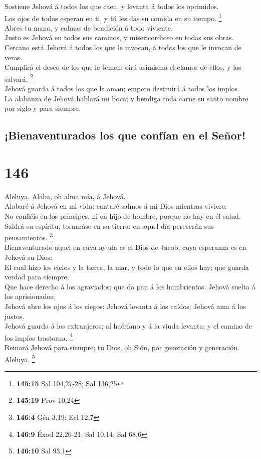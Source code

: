  Sostiene Jehová á todos los que caen, y levanta á todos
los oprimidos.\\
 Los ojos de todos esperan en ti, y tú les das su comida
en su tiempo. \footnote{\textbf{145:15} Sal 104,27-28; Sal 136,25}\\
 Abres tu mano, y colmas de bendición á todo viviente.\\
 Justo es Jehová en todos sus caminos, y misericordioso
en todas sus obras.\\
 Cercano está Jehová á todos los que le invocan, á todos
los que le invocan de veras.\\
 Cumplirá el deseo de los que le temen; oirá asimismo el
clamor de ellos, y los salvará. \footnote{\textbf{145:19} Prov 10,24}\\
 Jehová guarda á todos los que le aman; empero destruirá
á todos los impíos.\\
 La alabanza de Jehová hablará mi boca; y bendiga toda
carne su santo nombre por siglo y para siempre.

\hypertarget{bienaventurados-los-que-confuxedan-en-el-seuxf1or}{%
\subsection{¡Bienaventurados los que confían en el
Señor!}\label{bienaventurados-los-que-confuxedan-en-el-seuxf1or}}

\hypertarget{section-145}{%
\section{146}\label{section-145}}

 Aleluya. Alaba, oh alma mía, á Jehová.\\
 Alabaré á Jehová en mi vida: cantaré salmos á mi Dios
mientras viviere.\\
 No confiéis en los príncipes, ni en hijo de hombre,
porque no hay en él salud.\\
 Saldrá su espíritu, tornaráse en su tierra: en aquel día
perecerán sus pensamientos. \footnote{\textbf{146:4} Gén 3,19; Ecl 12,7}\\
 Bienaventurado aquel en cuya ayuda es el Dios de Jacob,
cuya esperanza es en Jehová su Dios:\\
 El cual hizo los cielos y la tierra, la mar, y todo lo
que en ellos hay; que guarda verdad para siempre;\\
 Que hace derecho á los agraviados; que da pan á los
hambrientos: Jehová suelta á los aprisionados;\\
 Jehová abre los ojos á los ciegos; Jehová levanta á los
caídos; Jehová ama á los justos.\\
 Jehová guarda á los extranjeros; al huérfano y á la viuda
levanta; y el camino de los impíos trastorna. \footnote{\textbf{146:9}
  Éxod 22,20-21; Sal 10,14; Sal 68,6}\\
 Reinará Jehová para siempre; tu Dios, oh Sión, por
generación y generación. Aleluya. \footnote{\textbf{146:10} Sal 93,1}

